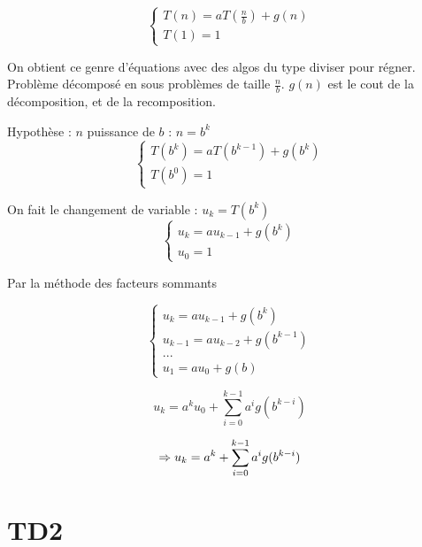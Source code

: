 \begin{exercice}

\[ \begin{cases} T(n)=aT(\frac{n}{b})+g(n) \\ T(1)=1 \end{cases} \]

On obtient ce genre d'équations avec des algos du type diviser pour régner. Problème décomposé en sous problèmes de taille $\frac{n}{b}$. $g(n)$ est le cout de la décomposition, et de la recomposition.

Hypothèse : $n$ puissance de $b$ : $n=b^k$
\[ \begin{cases} T(b^k)=aT(b^{k-1})+g(b^k) \\ T(b^0)=1 \end{cases} \]

On fait le changement de variable : $u_k=T(b^k)$
\[ \begin{cases}u_k=au_{k-1}+g(b^k) \\ u_0=1 \end{cases}\]

Par la méthode des facteurs sommants

\[ \begin{cases}
	u_k=au_{k-1}+g(b^k)\\
	u_{k-1}=au_{k-2}+g(b^{k-1})\\
	...\\
	u_1=au_0+g(b)
\end{cases}\]

\[u_k=a^ku_0+\sum_{i=0}^{k-1} a^ig(b^{k-i})\]

\[\Rightarrow u_k=a^k+\sum_{i=0}^{k-1} a^ig(b^{k-i})\]
\end{exercice}

\section{TD2}
